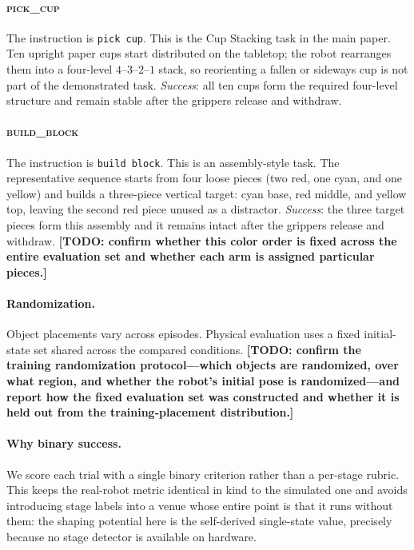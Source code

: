 \documentclass[letterpaper]{article} %
\newcommand{\todo}[1]{\textbf{[TODO: #1]}}
\begin{document}
\paragraph{\textsc{pick\_cup}} The instruction is \texttt{pick cup}. This is the
Cup Stacking task in the main paper. Ten upright paper cups start distributed
on the tabletop; the robot rearranges them into a four-level $4$--$3$--$2$--$1$
stack, so reorienting a fallen or sideways cup is not part of the demonstrated
task. \emph{Success}: all ten cups form the required four-level structure and
remain stable after the grippers release and withdraw.

\paragraph{\textsc{build\_block}} The instruction is \texttt{build block}. This is an
assembly-style task. The representative sequence starts from four loose pieces
(two red, one cyan, and one yellow) and builds a three-piece vertical target:
cyan base, red middle, and yellow top, leaving the second red piece unused as a
distractor. \emph{Success}: the three target pieces form this assembly and it
remains intact after the grippers release and withdraw. \todo{confirm whether
this color order is fixed across the entire evaluation set and whether each arm
is assigned particular pieces.}

\paragraph{Randomization.}
Object placements vary across episodes. Physical evaluation uses a fixed
initial-state set shared across the compared conditions. \todo{confirm the
training randomization protocol---which objects are randomized, over what
region, and whether the robot's initial pose is randomized---and report how the
fixed evaluation set was constructed and whether it is held out from the
training-placement distribution.}

\paragraph{Why binary success.}
We score each trial with a single binary criterion rather than a per-stage
rubric. This keeps the real-robot metric identical in kind to the simulated one
and avoids introducing stage labels into a venue whose entire point is that it
runs without them: the shaping potential here is the self-derived single-state
value, precisely because no stage detector is available on hardware.
\end{document}
